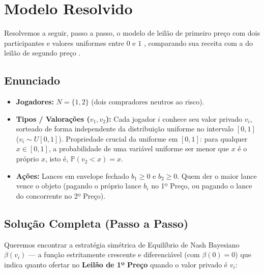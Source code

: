 \section{Modelo Resolvido}
\label{sec:modelo_resolvido}

Resolvemos a seguir, passo a passo, o modelo de leilão de primeiro preço com dois participantes e valores uniformes entre $0$ e $1$ \cite[p.~15--17]{vickrey1961}, comparando sua receita com a do leilão de segundo preço \cite[Apêndice~1.D, p.~48]{klemperer2004}.

\subsection{Enunciado}
\label{subsec:enunciado_modelo}

\begin{itemize}
    \item \textbf{Jogadores:} $N = \{1, 2\}$ (dois compradores neutros ao risco).
    \item \textbf{Tipos / Valorações ($v_1, v_2$):} Cada jogador $i$ conhece seu valor privado $v_i$, sorteado de forma independente da distribuição uniforme no intervalo $[0, 1]$ ($v_i \sim U[0, 1]$). Propriedade crucial da uniforme em $[0, 1]$: para qualquer $x \in [0, 1]$, a probabilidade de uma variável uniforme ser menor que $x$ é o próprio $x$, isto é, $\mathbb{P}(v_2 < x) = x$.
    \item \textbf{Ações:} Lances em envelope fechado $b_1 \ge 0$ e $b_2 \ge 0$. Quem der o maior lance vence o objeto (pagando o próprio lance $b_i$ no 1º Preço, ou pagando o lance do concorrente no 2º Preço).
\end{itemize}

\subsection{Solução Completa (Passo a Passo)}
\label{subsec:solucao_passo_a_passo}

Queremos encontrar a estratégia simétrica de Equilíbrio de Nash Bayesiano $\beta(v_i)$ --- a função estritamente crescente e diferenciável (com $\beta(0) = 0$) que indica quanto ofertar no \textbf{Leilão de 1º Preço} quando o valor privado é $v_i$:

